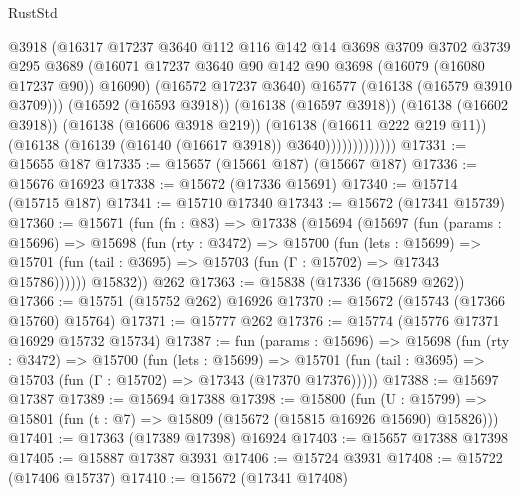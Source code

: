 \begin{lexlean}{RustStd}
\begin{coremodule}
                          @3918
                          (@16317
                            @17237
                            @3640
                            @112
                            @116
                            @142
                            @14
                            @3698
                            @3709
                            @3702
                            @3739
                            @295
                            @3689
                            (@16071
                              @17237
                              @3640
                              @90
                              @142
                              @90
                              @3698
                              (@16079 (@16080 @17237 @90))
                              @16090)
                            (@16572 @17237 @3640)
                            @16577
                            (@16138 (@16579 @3910 @3709)))
                          (@16592 (@16593 @3918))
                          (@16138 (@16597 @3918))
                          (@16138 (@16602 @3918))
                          (@16138 (@16606 @3918 @219))
                          (@16138 (@16611 @222 @219 @11))
                          (@16138 (@16139 (@16140 (@16617 @3918)) @3640)))))))))))))
@17331 := @15655 @187
@17335 := @15657 (@15661 @187) (@15667 @187)
@17336 := @15676 @16923
@17338 := @15672 (@17336 @15691)
@17340 := @15714 (@15715 @187)
@17341 := @15710 @17340
@17343 := @15672 (@17341 @15739)
@17360 := @15671
    (fun (fn : @83) =>
    @17338
      (@15694
        (@15697
          (fun (params : @15696) =>
          @15698
            (fun (rty : @3472) =>
            @15700
              (fun (lets : @15699) =>
              @15701 (fun (tail : @3695) => @15703 (fun (Γ : @15702) => @17343 @15786))))))
        @15832))
    @262
@17363 := @15838 (@17336 (@15689 @262))
@17366 := @15751 (@15752 @262) @16926
@17370 := @15672 (@15743 (@17366 @15760) @15764)
@17371 := @15777 @262
@17376 := @15774 (@15776 @17371 @16929 @15732 @15734)
@17387 := fun (params : @15696) =>
  @15698
    (fun (rty : @3472) =>
    @15700
      (fun (lets : @15699) =>
      @15701 (fun (tail : @3695) => @15703 (fun (Γ : @15702) => @17343 (@17370 @17376)))))
@17388 := @15697 @17387
@17389 := @15694 @17388
@17398 := @15800
    (fun (U : @15799) => @15801 (fun (t : @7) => @15809 (@15672 (@15815 @16926 @15690) @15826)))
@17401 := @17363 (@17389 @17398) @16924
@17403 := @15657 @17388 @17398
@17405 := @15887 @17387 @3931
@17406 := @15724 @3931
@17408 := @15722 (@17406 @15737)
@17410 := @15672 (@17341 @17408)

\end{coremodule}
\end{lexlean}
